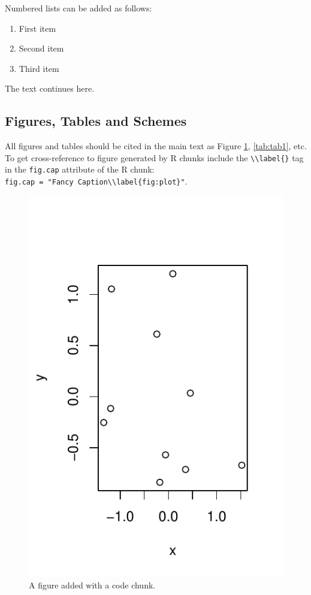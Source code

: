 \documentclass[notspecified,article,submit,moreauthors,pdftex]{Definitions/mdpi}
\providecommand{\tightlist}{%
  \setlength{\itemsep}{0pt}\setlength{\parskip}{0pt}}
\begin{document}
Numbered lists can be added as follows:

\begin{enumerate}
\def\labelenumi{\arabic{enumi}.}
\tightlist
\item
  First item
\item
  Second item
\item
  Third item
\end{enumerate}

The text continues here.

\hypertarget{figures-tables-and-schemes}{%
\subsection{Figures, Tables and
Schemes}\label{figures-tables-and-schemes}}

All figures and tables should be cited in the main text as Figure
\ref{fig:fig1}, \ref{tab:tab1}, etc. To get cross-reference to figure
generated by R chunks include the
\texttt{\textbackslash{}\textbackslash{}label\{\}} tag in the
\texttt{fig.cap} attribute of the R chunk:
\texttt{fig.cap\ =\ "Fancy\ Caption\textbackslash{}\textbackslash{}label\{fig:plot\}"}.

\begin{figure}
\centering
\includegraphics{ProyectoAED2023_files/figure-latex/fig1-1.pdf}
\caption{A figure added with a code chunk.\label{fig:fig1}}
\end{figure}
\end{document}
